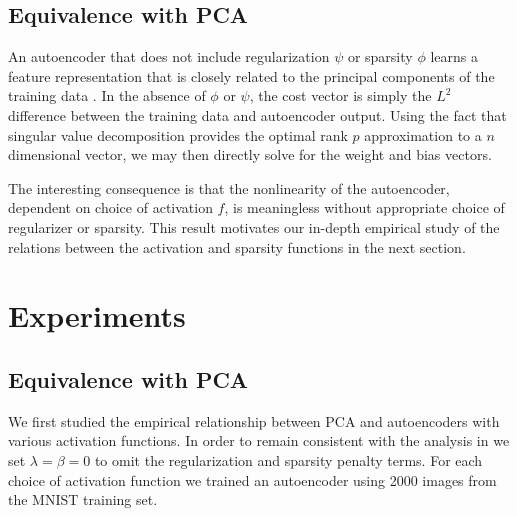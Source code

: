 \documentclass[twocolumn]{article}
\begin{document}
\subsection{Equivalence with PCA}
An autoencoder that does not include regularization $\psi$ or sparsity $\phi$
learns a feature representation that is closely related to the principal
components of the training data \cite{bourlard1988auto}. In the absence of
$\phi$ or $\psi$, the cost vector is simply the $L^2$ difference between the
training data and autoencoder output. Using the fact that singular value
decomposition provides the optimal rank $p$ approximation to a $n$ dimensional
vector, we may then directly solve for the weight and bias vectors.

The interesting consequence is that the nonlinearity of the autoencoder,
dependent on choice of activation $f$, is meaningless without appropriate choice
of regularizer or sparsity. This result motivates our in-depth empirical study
of the relations between the activation and sparsity functions in the next
section.


\section{Experiments}
\subsection{Equivalence with PCA}
We first studied the empirical relationship between PCA and autoencoders with
various activation functions. In order to remain consistent with the analysis
in \cite{bourlard1988auto} we set $\lambda=\beta=0$ to omit the regularization
and sparsity penalty terms. For each choice of activation function we trained
an autoencoder using 2000 images from the MNIST \cite{lecun1998mnist} training
set.
\end{document}
